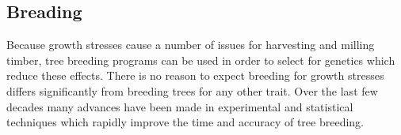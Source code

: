 \subsection{Breading}
Because growth stresses cause a number of issues for harvesting and milling
timber, tree breeding programs can be used in order to select for
genetics which reduce these effects. There is no reason to expect  breeding for
growth stresses differs significantly from breeding trees for
any other trait. Over the last few decades many advances have been made in
experimental and statistical techniques which rapidly improve the time and
accuracy of tree breeding.